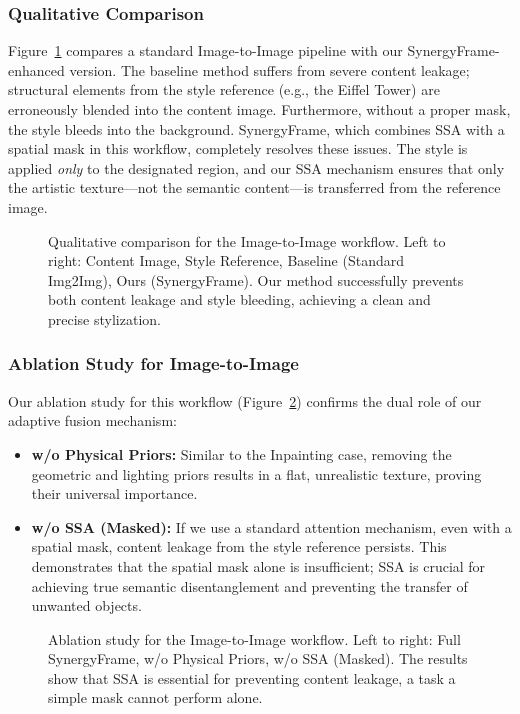 \documentclass[letterpaper]{article} %
\begin{document}
\subsubsection{Qualitative Comparison}
Figure~\ref{fig:img2img_comparison} compares a standard Image-to-Image pipeline with our SynergyFrame-enhanced version. The baseline method suffers from severe content leakage; structural elements from the style reference (e.g., the Eiffel Tower) are erroneously blended into the content image. Furthermore, without a proper mask, the style bleeds into the background. SynergyFrame, which combines SSA with a spatial mask in this workflow, completely resolves these issues. The style is applied \textit{only} to the designated region, and our SSA mechanism ensures that only the artistic texture—not the semantic content—is transferred from the reference image.

\begin{figure}[h]
  \centering
  \caption{Qualitative comparison for the Image-to-Image workflow. Left to right: Content Image, Style Reference, Baseline (Standard Img2Img), Ours (SynergyFrame). Our method successfully prevents both content leakage and style bleeding, achieving a clean and precise stylization.}
  \label{fig:img2img_comparison}
\end{figure}

\subsubsection{Ablation Study for Image-to-Image}
Our ablation study for this workflow (Figure~\ref{fig:img2img_ablation}) confirms the dual role of our adaptive fusion mechanism:
\begin{itemize}
    \item \textbf{w/o Physical Priors:} Similar to the Inpainting case, removing the geometric and lighting priors results in a flat, unrealistic texture, proving their universal importance.
    \item \textbf{w/o SSA (Masked):} If we use a standard attention mechanism, even with a spatial mask, content leakage from the style reference persists. This demonstrates that the spatial mask alone is insufficient; SSA is crucial for achieving true semantic disentanglement and preventing the transfer of unwanted objects.
\end{itemize}

\begin{figure}[h]
  \centering
  \caption{Ablation study for the Image-to-Image workflow. Left to right: Full SynergyFrame, w/o Physical Priors, w/o SSA (Masked). The results show that SSA is essential for preventing content leakage, a task a simple mask cannot perform alone.}
  \label{fig:img2img_ablation}
\end{figure}
\end{document}

